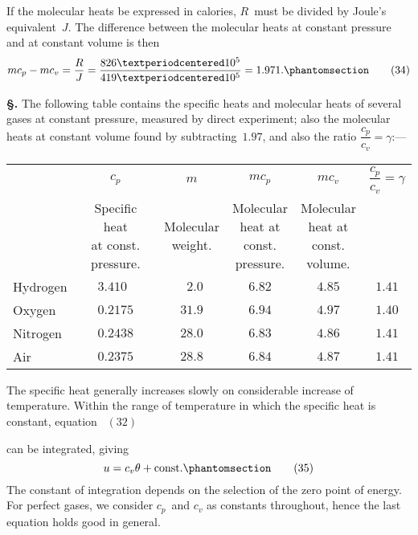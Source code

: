 \documentclass[12pt]{book}[2005/09/16]
\newcommand{\Chg}[2]{#2}
\newcommand{\Add}[1]{\Chg{}{#1}}
\newlength{\TmpLen}
\newcommand{\TableFont}{\footnotesize}%
\newcommand{\ColumnHeading}[2]{%
  \settowidth{\TmpLen}{#1}%
  \parbox[c]{\TmpLen}{\centering\medskip #2\medskip}%
}
\newcommand{\Strut}[1][12pt]{\rule{0pt}{#1}}
\newcommand{\Section}[1]{
  \medskip\par\textbf{§\;#1}
  \label{section:#1}
}
\newcommand{\Tag}[1]{%
  \phantomsection\label{eqn:#1}\tag*{\ensuremath{#1}}%
}
\newcommand{\Eq}[1]{%
  \hyperref[eqn:#1]{\ensuremath{#1}}%
}
\newcommand{\const}{\text{const.}}
\newcommand{\Z}{\phantom{0}}
\begin{document}
If the molecular heats be expressed in calories, $R$~must
be divided by Joule's equivalent~$J$. The difference between
the molecular heats at constant pressure and at
constant volume is then
\[
mc_{p} - mc_{v} = \frac{R}{J} = \frac{826 · 10^{5}}{419 · 10^{5}} = 1.971\Add{.}
\Tag{(34)}
\]

\Section{87.} The following table contains the specific heats
%
%
%
%
and molecular heats of several gases at constant pressure,
measured by direct experiment; also the molecular heats
at constant volume found by subtracting~$1.97$, and also
the ratio $\dfrac{c_{p}}{c_{v}} = \gamma$:---
\begin{center}
\TableFont
\begin{tabular}{l*{5}{|@{\;}c@{\;}}}
\hline
\Strut[16pt]
& $c_{p}$ & $m$ & $mc_{p}$ & $mc_{v}$ & $\dfrac{c_{p}}{c_{v}} = \gamma$ \\
& \ColumnHeading{Specific heat}{Specific heat \\
at const. \\
pressure.}
&
\ColumnHeading{Molecular}{Molecular \\
weight.}
&
\ColumnHeading{Molecular}{Molecular \\
heat at \\
const. \\
pressure.}
&
\ColumnHeading{Molecular}{Molecular \\
heat at \\
const. \\
volume.}
& \\
\Strut
Hydrogen & $3.410\Z$ & $\Z2.0$ & $6.82$ & $4.85$ & $1.41$ \\
Oxygen & $0.2175$ & $31.9$ & $6.94$ & $4.97$ & $1.40$ \\
Nitrogen & $0.2438$ & $28.0$ & $6.83$ & $4.86$ & $1.41$ \\
Air & $0.2375$ & $28.8$ & $6.84$ & $4.87$ & $1.41$ \\
\hline
\end{tabular}
\end{center}

The specific heat generally increases slowly on considerable
increase of temperature. Within the range of
temperature in which the specific heat is constant, equation~\Eq{(32)}
can be integrated, giving
\[
u = c_{v} \theta + \const
\Tag{(35)}
\]
The constant of integration depends on the selection of the
zero point of energy. For perfect gases, we consider $c_{p}$~and
$c_{v}$ as constants throughout, hence the last equation holds
good in general.
\end{document}
